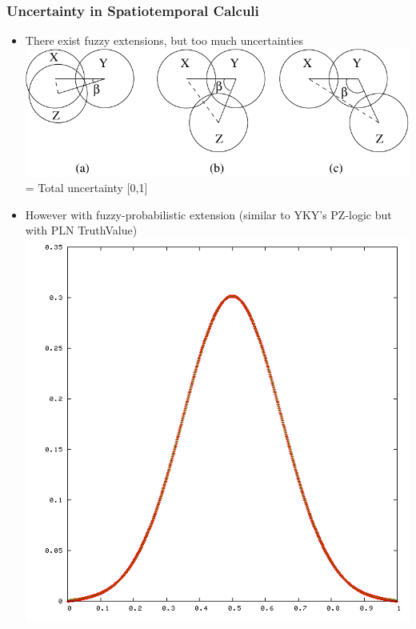 \documentclass{beamer}
\begin{document}
\frame
{
  \frametitle{\alert{Uncertainty} in Spatiotemporal Calculi}

  \begin{itemize}
  \item<+-> There exist \alert{fuzzy} extensions, but too much uncertainties\\
    \includegraphics[scale=0.4]{circles3Conf.pdf} = Total uncertainty \alert{[0,1]}
  \item<+-> However with \alert{fuzzy-probabilistic} extension (similar to YKY's PZ-logic but with PLN TruthValue)
    \includegraphics[scale=0.2]{gaussian_pulse_1d.png}
  \end{itemize}
}
\end{document}
